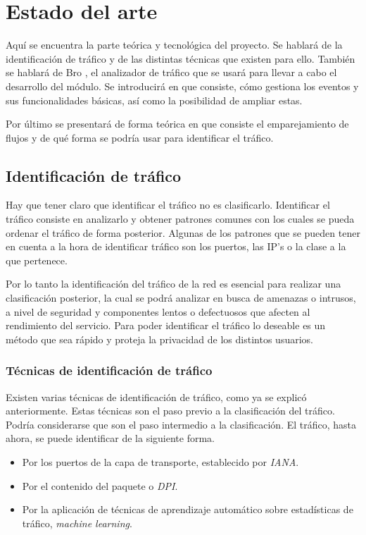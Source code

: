 \chapter{Estado del arte}

Aquí se encuentra la parte teórica y tecnológica del proyecto. Se hablará de la identificación de tráfico y de 
las distintas técnicas que existen para ello. También se hablará de Bro \cite{broindex}, el 
analizador de tráfico que se usará para 
llevar a cabo el desarrollo del módulo. Se introducirá en que consiste, cómo gestiona los eventos y sus 
funcionalidades básicas, así como la posibilidad de ampliar estas.

\intro Por último se presentará de forma teórica en que consiste el emparejamiento de flujos y de qué forma 
se podría usar para identificar el tráfico.

\section{Identificación de tráfico}

Hay que tener claro que identificar el tráfico no es clasificarlo. Identificar el tráfico consiste en analizarlo 
y obtener patrones comunes con los cuales se pueda ordenar el tráfico de forma posterior. Algunas de los patrones 
que se pueden tener en cuenta a la hora de identificar tráfico son los puertos, las IP's o la clase a la que 
pertenece.

\intro Por lo tanto la identificación del tráfico de la red es esencial para realizar una clasificación 
posterior, la cual se podrá analizar en busca de amenazas o intrusos, a nivel de seguridad y componentes lentos 
o defectuosos que afecten al rendimiento del servicio. Para poder identificar el tráfico lo deseable es un 
método que sea rápido y proteja la privacidad de los distintos usuarios.

\subsection{Técnicas de identificación de tráfico}

Existen varias técnicas de identificación de tráfico, como ya se explicó anteriormente. Estas técnicas son 
el paso previo a la clasificación del tráfico. Podría considerarse que son el paso intermedio a la clasificación. 
El tráfico, hasta ahora, se puede identificar de la siguiente forma.

\begin{itemize}
\item Por los puertos de la capa de transporte, establecido por \textit{IANA}. \cite{iana}
\item Por el contenido del paquete o \textit{DPI}. \cite{payload}
\item Por la aplicación de técnicas de aprendizaje automático sobre estadísticas de tráfico, \textit{machine 
learning}. \cite{learning}
\end{itemize}

